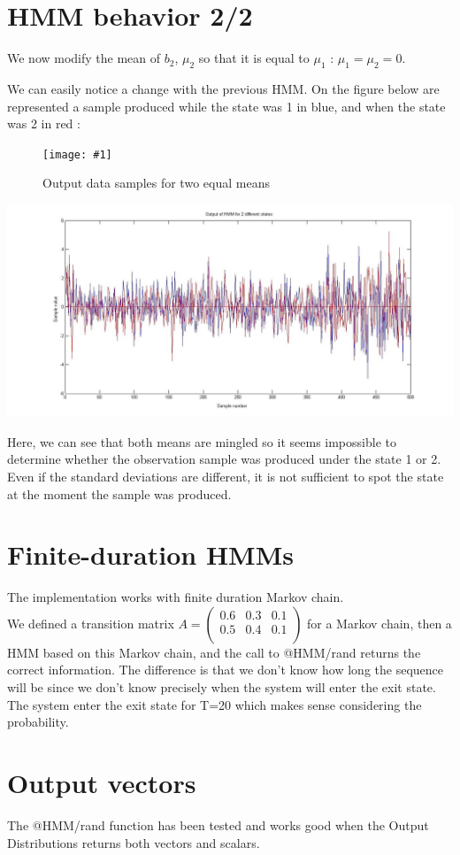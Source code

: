 \documentclass[a4paper]{report}
\newcommand{\img}[3]{\begin{figure}[!h] \centering \texttt{[image: \#1]}\captionsetup{justification=centering} \caption{#3} \label{#1} \end{figure}}
\begin{document}
\section{HMM behavior 2/2}
We now modify the mean of $b_{2}$, $\mu_{2}$ so that it is equal to $\mu_{1}$ : $\mu_{1}=\mu_{2}=0$. 

We can easily notice a change with the previous HMM. On the figure below are represented a sample produced while the state was 1 in blue, and when the state was 2 in red :

\img{hmm_same_mean}{0.7}{Output data samples for two equal means}
\includegraphics[width=15cm]{Question_5_mean_bis.jpg}

Here, we can see that both means are mingled so it seems impossible to determine whether the observation sample was produced under the state 1 or 2. Even if the standard deviations are different, it is not sufficient to spot the state at the moment the sample was produced. 

\section{Finite-duration HMMs}
The implementation works with finite duration Markov chain.\\
We defined a transition matrix $A = \begin{pmatrix}
  0.6 & 0.3 & 0.1\\
  0.5 & 0.4 & 0.1\\
\end{pmatrix}$ for a Markov chain, then a HMM based on this Markov chain, and the call to @HMM/rand returns the correct information. The difference is that we don't know how long the sequence will be since we don't know precisely when the system will enter the exit state. The system enter the exit state for T=20 which makes sense considering the probability.

\section{Output vectors}
The @HMM/rand function has been tested and works good when the Output Distributions returns both vectors and scalars.
\end{document}

